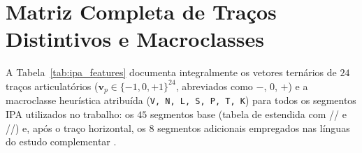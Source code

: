 \documentclass[a4paper, twocolumn, 11pt, twoside]{article}
\begin{document}


\appendix
\section{Matriz Completa de Traços Distintivos e Macroclasses}
A Tabela~\ref{tab:ipa_features} documenta integralmente os vetores ternários de $24$ traços articulatórios ($\mathbf{v}_p \in \{-1, 0, +1\}^{24}$, abreviados como $-$, $0$, $+$) e a macroclasse heurística atribuída (\texttt{V, N, L, S, P, T, K}) para todos os segmentos IPA utilizados no trabalho: os $45$ segmentos base (tabela de \citet{hulden2012distinctive} estendida com // e /\textturny/) e, após o traço horizontal, os $8$ segmentos adicionais empregados nas línguas do estudo complementar \citep{araujo2026lipspell}.
\end{document}
